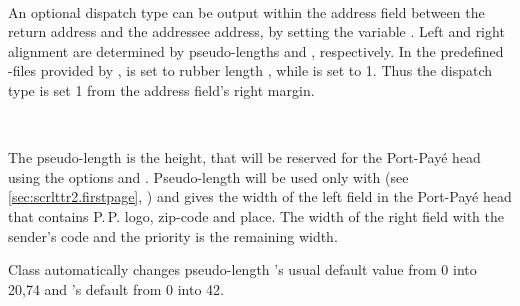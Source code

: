 \begin{Declaration}
  \\
\end{Declaration}
%
%
An optional dispatch type can be output within the address field between the
return address and the addressee address, by setting the variable
. Left and right alignment are determined by
pseudo-lengths  and
, respectively. In the predefined
-files
provided by \KOMAScript,  is set to rubber length
, while  is set to
1. Thus the dispatch type is set 1 from the address field's
right margin.
%
%
%


\begin{Declaration}
  \\
\end{Declaration}
%
%
The pseudo-length  is
the height, that will be reserved for the Port-Pay\'e head using the options
 and
%
. Pseudo-length
 will be used only with  (see
\autoref{sec:scrlttr2.firstpage},
) and gives the width of the left
field in the Port-Pay\'e head that contains P.\,P. logo, zip-code and
place. The width of the right field with the sender's code and the priority is
the remaining width.

Class  automatically changes
pseudo-length 's usual default value
from 0 into 20,74 and 's default from
0 into 42.%
%
%
%

